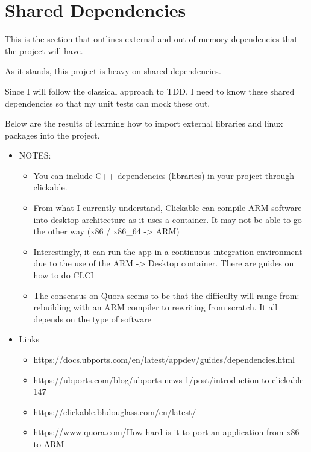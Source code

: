 \section{Shared Dependencies}

This is the section that outlines external and out-of-memory dependencies that the project will have.

As it stands, this project is heavy on shared dependencies.

Since I will follow the classical approach to TDD, I need to know these shared dependencies so that my unit tests can mock these out.


Below are the results of learning how to import external libraries and linux packages into the project. 


\begin{itemize}
	\item NOTES:
	\begin{itemize}
		\item You can include C++ dependencies (libraries) in your project through clickable.
		\item From what I currently understand, Clickable can compile ARM software into desktop architecture as it uses a container. It may not be able to go the other way (x86 / x86\_64 -> ARM)
		\item Interestingly, it can run the app in a continuous integration environment due to the use of the ARM -> Desktop container. There are guides on how to do CLCI
		\item The consensus on Quora seems to be that the difficulty will range from: rebuilding with an ARM compiler to rewriting from scratch. It all depends on the type of software
	\end{itemize}
\end{itemize}



\begin{itemize}
	\item Links
	\begin{itemize}
		\item https://docs.ubports.com/en/latest/appdev/guides/dependencies.html
		\item https://ubports.com/blog/ubports-news-1/post/introduction-to-clickable-147
		\item https://clickable.bhdouglass.com/en/latest/
		\item https://www.quora.com/How-hard-is-it-to-port-an-application-from-x86-to-ARM
	\end{itemize}
\end{itemize}



